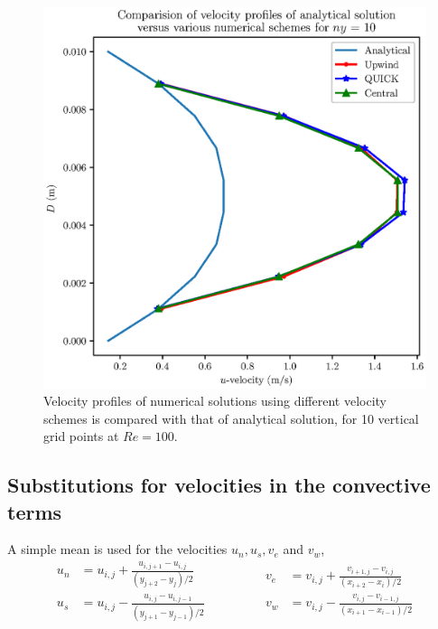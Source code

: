 \documentclass[12pt,a4paper,fleqn]{article}
\begin{document}
\begin{figure}[H]
    \centering
    \includegraphics[width=\textwidth]{Re-100_ny-10_profilesComparison.eps}
    \caption{Velocity profiles of numerical solutions using different velocity schemes is compared with that of analytical solution, for 10 vertical grid points at \(Re = 100\).}
    \label{fig:Re-100_ny-10_profilesComparison}
\end{figure}

\subsection{Substitutions for velocities in the convective terms}
A simple mean is used for the velocities $u_n, u_s, v_e$ and $v_w$,
\begin{equation*}
\begin{aligned}
u_n &= u_{i,j} + \frac{u_{i,j+1} - u_{i,j}}{(y_{j+2}-y_j)/2}\\
u_s &= u_{i,j} - \frac{u_{i,j} - u_{i,j-1}}{(y_{j+1}-y_{j-1})/2}
\end{aligned}
\qquad\qquad
\begin{aligned}
v_e &= v_{i,j} + \frac{v_{i+1,j} - v_{i,j}}{(x_{i+2}-x_i)/2}\\
v_w &= v_{i,j} - \frac{v_{i,j} - v_{i-1,j}}{(x_{i+1}-x_{i-1})/2}
\end{aligned}
\end{equation*}
\end{document}
